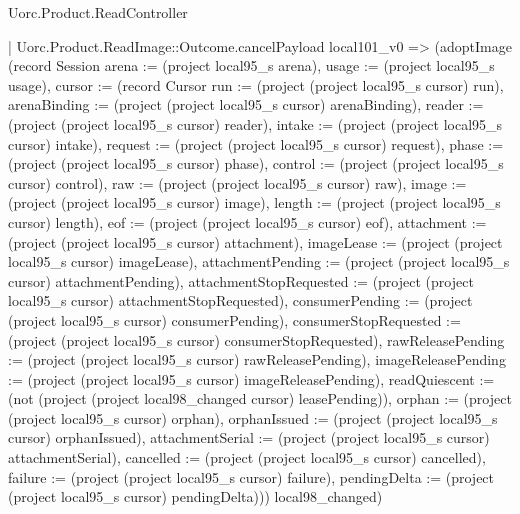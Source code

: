 \begin{lexlean}{Uorc.Product.ReadController}
\begin{semanticmodule}
{      | Uorc.Product.ReadImage::Outcome.cancelPayload local101_v0 => (adoptImage (record Session {arena := (project local95_s arena), usage := (project local95_s usage), cursor := (record Cursor {run := (project (project local95_s cursor) run), arenaBinding := (project (project local95_s cursor) arenaBinding), reader := (project (project local95_s cursor) reader), intake := (project (project local95_s cursor) intake), request := (project (project local95_s cursor) request), phase := (project (project local95_s cursor) phase), control := (project (project local95_s cursor) control), raw := (project (project local95_s cursor) raw), image := (project (project local95_s cursor) image), length := (project (project local95_s cursor) length), eof := (project (project local95_s cursor) eof), attachment := (project (project local95_s cursor) attachment), imageLease := (project (project local95_s cursor) imageLease), attachmentPending := (project (project local95_s cursor) attachmentPending), attachmentStopRequested := (project (project local95_s cursor) attachmentStopRequested), consumerPending := (project (project local95_s cursor) consumerPending), consumerStopRequested := (project (project local95_s cursor) consumerStopRequested), rawReleasePending := (project (project local95_s cursor) rawReleasePending), imageReleasePending := (project (project local95_s cursor) imageReleasePending), readQuiescent := (not (project (project local98_changed cursor) leasePending)), orphan := (project (project local95_s cursor) orphan), orphanIssued := (project (project local95_s cursor) orphanIssued), attachmentSerial := (project (project local95_s cursor) attachmentSerial), cancelled := (project (project local95_s cursor) cancelled), failure := (project (project local95_s cursor) failure), pendingDelta := (project (project local95_s cursor) pendingDelta)})}) local98_changed)
}
\end{semanticmodule}
\end{lexlean}
